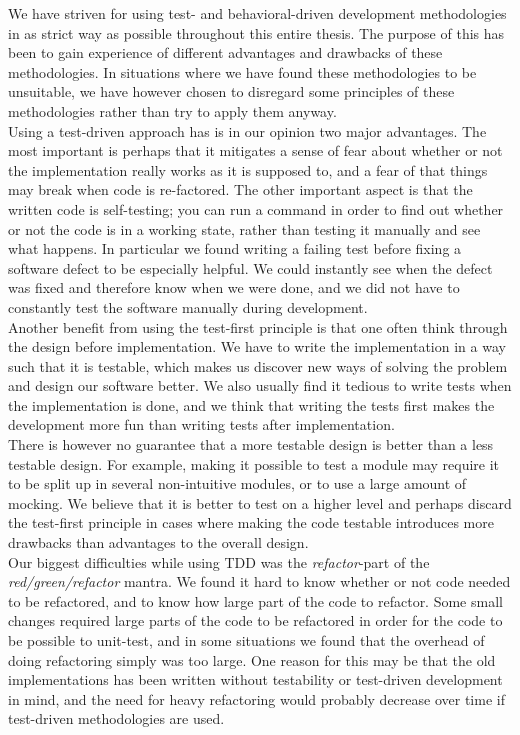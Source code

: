 
We have striven for using test- and behavioral-driven development
methodologies in as strict way as possible throughout this entire
thesis. The purpose of this has been to gain experience of different
advantages and drawbacks of these methodologies. In situations where we
have found these methodologies to be unsuitable, we have however chosen
to disregard some principles of these methodologies rather than try to
apply them anyway.\\

Using a test-driven approach has is in our opinion two major advantages.
The most important is perhaps that it mitigates a sense of fear about
whether or not the implementation really works as it is supposed to, and
a fear of that things may break when code is re-factored. The other
important aspect is that the written code is self-testing; you can run a
command in order to find out whether or not the code is in a working
state, rather than testing it manually and see what happens. In
particular we found writing a failing test before fixing a software
defect to be especially helpful. We could instantly see when the defect
was fixed and therefore know when we were done, and we did not have to
constantly test the software manually during development.\\

Another benefit from using the test-first principle is that one often
think through the design before implementation. We have to write the
implementation in a way such that it is testable, which makes us
discover new ways of solving the problem and design our software better.
We also usually find it tedious to write tests when the implementation
is done, and we think that writing the tests first makes the development
more fun than writing tests after implementation.\\

There is however no guarantee that a more testable design is better than
a less testable design. For example, making it possible to test a module
may require it to be split up in several non-intuitive modules, or to
use a large amount of mocking. We believe that it is better to test on a
higher level and perhaps discard the test-first principle in cases where
making the code testable introduces more drawbacks than advantages to
the overall design.\\

Our biggest difficulties while using TDD was the \emph{refactor}-part of
the \emph{red/green/refactor} mantra. We found it hard to know whether
or not code needed to be refactored, and to know how large part of the
code to refactor. Some small changes required large parts of the code to
be refactored in order for the code to be possible to unit-test, and in
some situations we found that the overhead of doing refactoring simply
was too large. One reason for this may be that the old implementations
has been written without testability or test-driven development in mind,
and the need for heavy refactoring would probably decrease over time if
test-driven methodologies are used.\\

